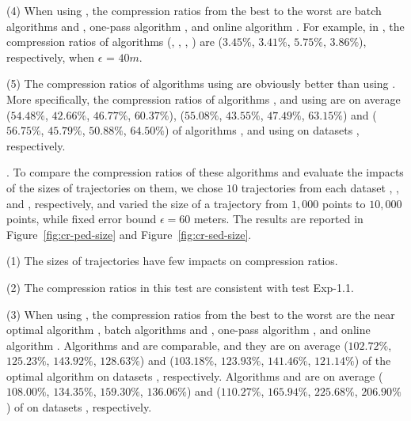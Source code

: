 \sstab (4) When using \sed, the compression ratios from the best
to the worst are batch algorithms \tpa and
\dpa, one-pass algorithm \cised, and online algorithm \squishe. 
For example, in \mopsi, the compression ratios of algorithms
(\tpa, \dpa, \squishe, \cised)
are ($3.45\%$, $3.41\%$, $5.75\%$, $3.86\%$), respectively, when $\epsilon$ = $40m$. 

%

\sstab (5) The compression ratios of algorithms using \ped are obviously better
than using \sed.
More specifically, the compression ratios of algorithms \optp, \tpa and \dpa
using \ped are on average ($54.48\%$, $42.66\%$, $46.77\%$, $60.37\%$),
($55.08\%$, $43.55\%$, $47.49\%$, $63.15\%$) and ($56.75\%$, $45.79\%$,
$50.88\%$, $64.50\%$) of algorithms \nopts, \tpa and \dpa using \sed on datasets \dSets, respectively.
	


.
To compare the compression ratios of these algorithms and evaluate the impacts of the sizes of trajectories on them, we chose $10$ trajectories from each dataset \ucar, \geolife, \mopsi and \act, respectively,
and varied the size  of a trajectory from $1,000$ points to $10,000$ points, while fixed error bound $\epsilon = 60$ meters.
The results are reported in Figure~\ref{fig:cr-ped-size} and Figure~\ref{fig:cr-sed-size}.


\sstab (1) The sizes of trajectories have few impacts on compression ratios.

\sstab (2) The compression ratios in this test are consistent with test Exp-1.1.

\sstab (3) When using \sed, the compression ratios from the best
to the worst are the near optimal algorithm \opt, batch algorithms \tpa and
\dpa, one-pass algorithm \cised, and online algorithm \squishe. 
%
{Algorithms \tpa and \dpa are comparable, and they are on average
($102.72\%$, $125.23\%$, $143.92\%$, $128.63\%$) and ($103.18\%$, $123.93\%$, $141.46\%$, $121.14\%$)
 of the optimal algorithm \opt on datasets \dSets, respectively.}
%
{Algorithms \cised and \squishe are on average ($108.00\%$,
  $134.35\%$, $159.30\%$, $136.06\%$) and ($110.27\%$, $165.94\%$, $225.68\%$, $206.90\%$)
 of \opt on datasets \dSets, respectively.}


